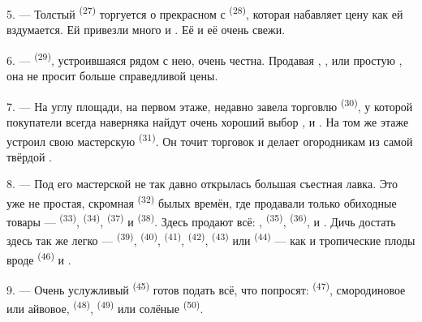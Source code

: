 5. --- Толстый  \textsuperscript{(27)} торгуется о прекрасном
 с  \textsuperscript{(28)}, которая набавляет цену
как ей вздумается. Ей привезли много  и
. Её  и её  очень свежи.

\VUsaut{4.0mm}
\VUsaut{3.0mm}

6. ---  \textsuperscript{(29)}, устроившаяся рядом с нею,
очень честна. Продавая , ,  или
простую , она не просит больше справедливой цены.

7. --- На углу площади, на первом этаже, недавно завела торговлю
 \textsuperscript{(30)}, у которой покупатели всегда наверняка
найдут очень хороший выбор , 
и . На том же этаже устроил свою мастерскую
 \textsuperscript{(31)}. Он точит  торговок и делает
огородникам  из самой твёрдой .

\VUsaut{4.0mm}
\VUsaut{3.0mm}

8. --- Под его мастерской не так давно открылась большая съестная лавка.
Это уже не простая, скромная  \textsuperscript{(32)}
былых времён, где продавали только обиходные товары --- 
\textsuperscript{(33)},  \textsuperscript{(34)}, 
\textsuperscript{(37)} и  \textsuperscript{(38)}. Здесь продают всё:
,  \textsuperscript{(35)},
 \textsuperscript{(36)},  и
. Дичь достать здесь так же легко --- 
\textsuperscript{(39)},  \textsuperscript{(40)}, 
\textsuperscript{(41)},  \textsuperscript{(42)}, 
\textsuperscript{(43)} или  \textsuperscript{(44)} --- как и
тропические плоды вроде  \textsuperscript{(46)} и .

9. --- Очень услужливый  \textsuperscript{(45)} готов подать
всё, что попросят:  \textsuperscript{(47)}, смородиновое или
айвовое,  \textsuperscript{(48)}, 
\textsuperscript{(49)} или солёные  \textsuperscript{(50)}.


